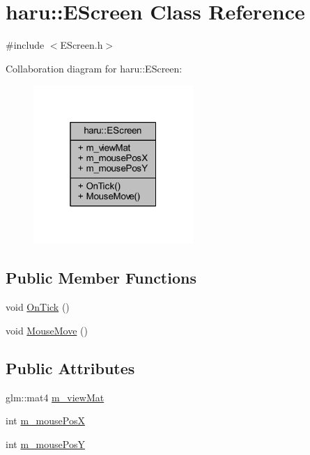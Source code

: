 \hypertarget{classharu_1_1_e_screen}{}\section{haru\+:\+:E\+Screen Class Reference}
\label{classharu_1_1_e_screen}


{\ttfamily \#include $<$E\+Screen.\+h$>$}



Collaboration diagram for haru\+:\+:E\+Screen\+:\nopagebreak
\begin{figure}[H]
\begin{center}
\leavevmode
\includegraphics[width=172pt]{classharu_1_1_e_screen__coll__graph}
\end{center}
\end{figure}
\subsection*{Public Member Functions}
\begin{DoxyCompactItemize}
\item 
void \mbox{\hyperlink{classharu_1_1_e_screen_a600b05ce7a481cd681067d0fe311dd38}{On\+Tick}} ()
\item 
void \mbox{\hyperlink{classharu_1_1_e_screen_acdd8c57de946cbaf9e1658b2e4027367}{Mouse\+Move}} ()
\end{DoxyCompactItemize}
\subsection*{Public Attributes}
\begin{DoxyCompactItemize}
\item 
glm\+::mat4 \mbox{\hyperlink{classharu_1_1_e_screen_ac0d95afec2a766900d06e922978b5a72}{m\+\_\+view\+Mat}}
\item 
int \mbox{\hyperlink{classharu_1_1_e_screen_ac921a15804e3ca53a941b68bd4c67590}{m\+\_\+mouse\+PosX}}
\item 
int \mbox{\hyperlink{classharu_1_1_e_screen_ae53e4805bd5c7fcf49d33a7aa6fcf128}{m\+\_\+mouse\+PosY}}
\end{DoxyCompactItemize}


